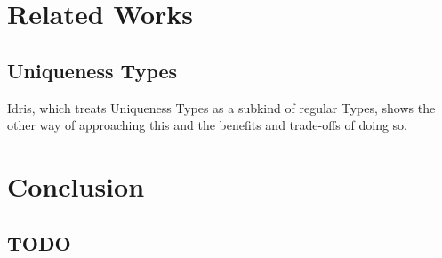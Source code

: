\documentclass[onehalf,11pt]{beavtex}
\begin{document}
\chapter{Related Works}

\section{Uniqueness Types}

Idris, which treats Uniqueness Types as a subkind of regular Types, shows
the other way of approaching this and the benefits and trade-offs of doing so.



\chapter{Conclusion}
\section{TODO}


{}

\end{document}

